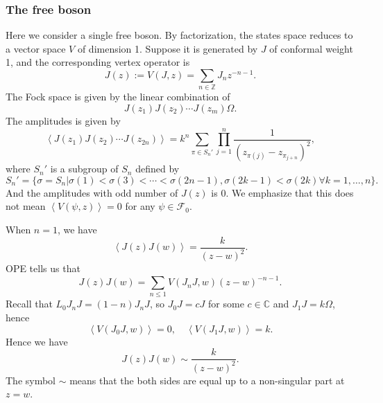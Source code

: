 \documentclass[10pt,reqno,draft]{article}
\numberwithin{equation}{section}
\numberwithin{figure}{section}
\numberwithin{table}{section}
\theoremstyle{plain}
\theoremstyle{definition}
\theoremstyle{remark}
\begin{document}
  \subsubsection{The free boson}
  Here we consider a single free boson. By factorization, the states space reduces to a vector space \(V\) of dimension 1. Suppose it is generated by \(J\) of conformal weight 1, and the corresponding vertex operator is 
  \begin{equation}
    J(z):=V(J,z)=\sum_{n\in \mathbb{Z}} J_{n}z^{-n-1}.
  \end{equation}
  The Fock space is given by the linear combination of 
  \begin{equation}
    J(z_1)J(z_2)\cdots J(z_{m})\Omega.
  \end{equation}
  The amplitudes is given by
  \begin{equation}
    \left< J(z_1)J(z_2)\cdots J(z_{2n}) \right> = k^{n}\sum_{\pi\in S_{n}'} \prod_{j=1}^{n} \frac{1}{(z_{\pi(j)}-z_{\pi_{j+n}})^{2}},
  \end{equation}
  where \(S_{n}'\) is a subgroup of \(S_{n}\) defined by
  \begin{equation}
    S_{n}'=\{\sigma=S_{n}|\sigma(1)<\sigma(3)<\cdots<\sigma(2n-1),\sigma(2k-1)<\sigma(2k)\forall k=1,\ldots,n\} .
  \end{equation}
  And the amplitudes with odd number of \(J(z)\) is 0. We emphasize that this does not mean \(\left<V(\psi,z) \right> =0\) for any \(\psi\in \mathcal{F}_{0}\).

  When \(n=1 \), we have 
  \[
  \left<J(z)J(w) \right> = \frac{k}{(z-w)^2}
  .\] 
  OPE tells us that 
  \begin{equation}
    J(z)J(w)=\sum_{n\le 1} V(J_{n}J,w)(z-w)^{-n-1}. 
  \end{equation}
  Recall that \(L_0J_{n}J=(1-n)J_{n}J\), so \(J_0J=cJ\) for some \(c\in \mathbb{C}\) and \(J_1J=k\Omega\), hence
  \[
      \left<V(J_0J,w) \right> =0, \quad\left< V(J_1J,w) \right> = k.
  \]
  Hence we have 
  \begin{equation}
    J(z)J(w)\sim \frac{k}{(z-w)^2}.
  \end{equation}
  The symbol \(\sim \) means that the both sides are equal up to a non-singular part at \(z=w\).
  
    
    
\end{document}
